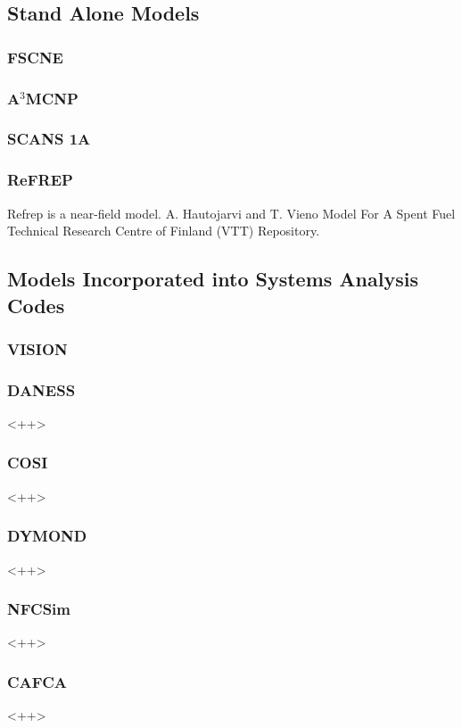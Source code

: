 \subsection{Stand Alone Models}
\subsubsection{FSCNE}

\subsubsection{A$^3$MCNP}

\subsubsection{SCANS 1A}

\subsubsection{ReFREP}
Refrep is a near-field model.  A. Hautojarvi and T. Vieno Model For A Spent Fuel Technical Research Centre of Finland (VTT) Repository.\cite{gaps}
\subsection{Models Incorporated into Systems Analysis Codes}
\subsubsection{VISION}
\subsubsection{DANESS}<++>
\subsubsection{COSI}<++>
\subsubsection{DYMOND}<++>
\subsubsection{NFCSim}<++>
\subsubsection{CAFCA}<++>
